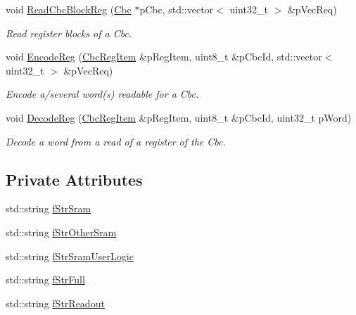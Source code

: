 \begin{DoxyCompactItemize}
void \hyperlink{class_ph2___hw_interface_1_1_cbc_interface_ac9ec0a962f0527a8298c1771240bf838}{Read\-Cbc\-Block\-Reg} (\hyperlink{class_ph2___hw_description_1_1_cbc}{Cbc} $\ast$p\-Cbc, std\-::vector$<$ uint32\-\_\-t $>$ \&p\-Vec\-Req)
\begin{DoxyCompactList}\small\item\em Read register blocks of a Cbc. \end{DoxyCompactList}\item 
void \hyperlink{class_ph2___hw_interface_1_1_cbc_interface_a2718fb251129aef788f6068c53dd1b44}{Encode\-Reg} (\hyperlink{struct_ph2___hw_description_1_1_cbc_reg_item}{Cbc\-Reg\-Item} \&p\-Reg\-Item, uint8\-\_\-t \&p\-Cbc\-Id, std\-::vector$<$ uint32\-\_\-t $>$ \&p\-Vec\-Req)
\begin{DoxyCompactList}\small\item\em Encode a/several word(s) readable for a Cbc. \end{DoxyCompactList}\item 
void \hyperlink{class_ph2___hw_interface_1_1_cbc_interface_acf2c23c04d1f48b3d1ad875d63e6b98e}{Decode\-Reg} (\hyperlink{struct_ph2___hw_description_1_1_cbc_reg_item}{Cbc\-Reg\-Item} \&p\-Reg\-Item, uint8\-\_\-t \&p\-Cbc\-Id, uint32\-\_\-t p\-Word)
\begin{DoxyCompactList}\small\item\em Decode a word from a read of a register of the Cbc. \end{DoxyCompactList}\end{DoxyCompactItemize}
\subsection*{Private Attributes}
\begin{DoxyCompactItemize}
\item 
std\-::string \hyperlink{class_ph2___hw_interface_1_1_cbc_interface_aaddc36b6ef3360c0a99da44c53a3242f}{f\-Str\-Sram}
\item 
std\-::string \hyperlink{class_ph2___hw_interface_1_1_cbc_interface_a3277ad84e5806e7992563dbb6122fdb9}{f\-Str\-Other\-Sram}
\item 
std\-::string \hyperlink{class_ph2___hw_interface_1_1_cbc_interface_a61c9447688cc556e33d7051c26459755}{f\-Str\-Sram\-User\-Logic}
\item 
std\-::string \hyperlink{class_ph2___hw_interface_1_1_cbc_interface_a72fbeb3befe9e533fc21cc568e540df4}{f\-Str\-Full}
\item 
std\-::string \hyperlink{class_ph2___hw_interface_1_1_cbc_interface_ade4f2642613500ee5f1963c22509c48b}{f\-Str\-Readout}
\end{DoxyCompactItemize}
